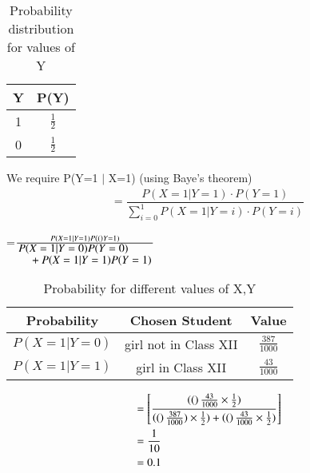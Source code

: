\begin{table}[ht]
\caption{Probability distribution for values of Y}
\label{2.12:table:1}
\begin{center}
    \begin{tabular}{|c|c|}
    \hline
    Y & P(Y)\\
    \hline
    1 & $\frac{1}{2}$ \\
    \hline
    0 & $\frac{1}{2}$\\
    \hline
    \end{tabular}
\end{center} 
\end{table}
We require P(Y=1 $\vert$ X=1) (using Baye's theorem)
\begin{align}
=\dfrac{P(X=1\vert Y=1)\cdot P(Y=1)}{\sum_{i=0}^{1} P(X=1\vert Y=i)\cdot P(Y=i)}
\end{align}
\begin{center} 
=$\frac{P(X=1 \vert Y=1)P\brak(Y=1)}{\splitfrac{P(X=1\vert Y=0)P(Y=0)}{+P(X=1\vert Y=1)P(Y=1)}}$
\end{center}
\begin{table}[ht]
\caption{Probability for different values of X,Y}
\label{2.12:table:2}
\begin{center}
    \begin{tabular}{|c|c|c|}
    \hline
    Probability & Chosen Student & Value\\
    \hline
    $P(X=1\vert Y=0)$ & girl not in Class XII & $\frac{387}{1000}$\\
    \hline
    $ P(X=1\vert Y=1)$ & girl in Class XII & $\frac{43}{1000}$ \\
    \hline
    \end{tabular}
\end{center}    
\end{table} 
\begin{align}
&=\left[\dfrac{\left((\right) \frac{43}{1000}\times \frac{1}{2})}{\left((\right) \frac{387}{1000})\times \frac{1}{2}) + \left((\right) \frac{43}{1000}\times \frac{1}{2})}\right]\\
&=\dfrac{1}{10}\\ 
&=0.1
\end{align}